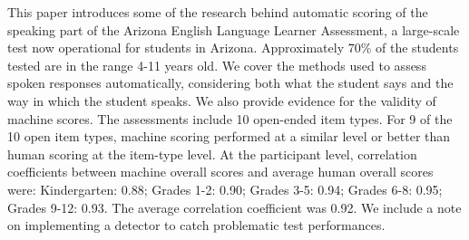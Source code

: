 This paper introduces some of the research behind automatic scoring of the speaking part of the Arizona English Language Learner Assessment, a large-scale test now operational for students in Arizona.  Approximately 70\% of the students tested are in the range 4-11 years old. We cover the methods used to assess spoken responses automatically, considering both what the student says and the way in which the student speaks.  We also provide evidence for the validity of machine scores.  The assessments include 10 open-ended item types. For 9 of the 10 open item types, machine scoring performed at a similar level or better than human scoring at the item-type level.  At the participant level, correlation coefficients between machine overall scores and average human overall scores were:  Kindergarten: 0.88; Grades 1-2: 0.90; Grades 3-5: 0.94; Grades 6-8: 0.95; Grades 9-12: 0.93.  The average correlation coefficient was 0.92.  We include a note on implementing a detector to catch problematic test performances.
